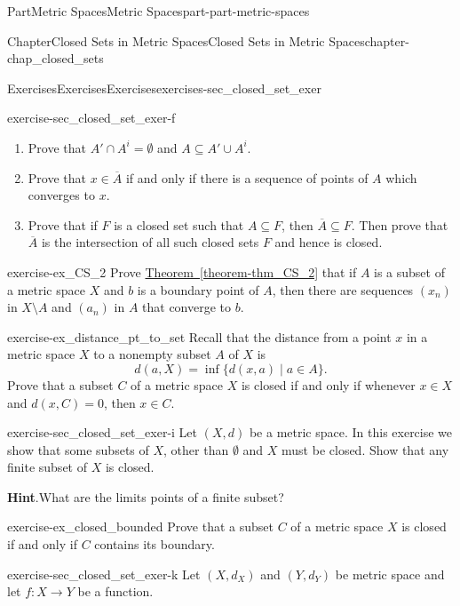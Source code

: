 \documentclass[oneside,10pt,]{book}
\newcommand{\blocktitlefont}{\relax}
\newcommand{\xreffont}{\relax}
\numberwithin{equation}{chapter}
\begin{document}
\begin{partptx}{Part}{Metric Spaces}{}{Metric Spaces}{}{}{part-part-metric-spaces}
\begin{chapterptx}{Chapter}{Closed Sets in Metric Spaces}{}{Closed Sets in Metric Spaces}{}{}{chapter-chap_closed_sets}
\begin{exercises-section}{Exercises}{Exercises}{}{Exercises}{}{}{exercises-sec_closed_set_exer}
\begin{divisionexercise}{6}{}{}{exercise-sec_closed_set_exer-f}
\begin{enumerate}[font=\bfseries,label=(\alph*),ref=\alph*]
\item{}Prove that \(A' \cap A^i = \emptyset\) and \(A \subseteq A' \cup A^i\).%
\item{}Prove that \(x \in \overline{A}\) if and only if there is a sequence of points of \(A\) which converges to \(x\).%
\item{}Prove that if \(F\) is a closed set such that \(A \subseteq F\), then \(\overline{A} \subseteq F\). Then prove that \(\overline{A}\) is the intersection of all such closed sets \(F\) and hence is closed.%
\end{enumerate}%
\end{divisionexercise}%
\begin{divisionexercise}{7}{}{}{exercise-ex_CS_2}%
Prove \hyperref[theorem-thm_CS_2]{Theorem~{\xreffont\ref{theorem-thm_CS_2}}} that if \(A\) is a subset of a metric space \(X\) and \(b\) is a boundary point of \(A\), then there are sequences \((x_n)\) in \(X \setminus A\) and \((a_n)\) in \(A\) that converge to \(b\).%
\end{divisionexercise}%
\begin{divisionexercise}{8}{}{}{exercise-ex_distance_pt_to_set}%
Recall that the distance from a point \(x\) in a metric space \(X\) to a nonempty subset \(A\) of \(X\) is%
\begin{equation*}
d(a,X) = \inf\{d(x,a) \mid a \in A\}\text{.}
\end{equation*}
Prove that a subset \(C\) of a metric space \(X\) is closed if and only if whenever \(x \in X\) and \(d(x,C) = 0\), then \(x \in C\).%
\end{divisionexercise}%
\begin{divisionexercise}{9}{}{}{exercise-sec_closed_set_exer-i}%
Let \((X,d)\) be a metric space. In this exercise we show that some subsets of \(X\), other than \(\emptyset\) and \(X\) must be closed. Show that any finite subset of \(X\) is closed.%
\par\smallskip%
\noindent\textbf{\blocktitlefont Hint}.\hypertarget{hint-sec_closed_set_exer-i-b}{}\quad{}What are the limits points of a finite subset?%
\end{divisionexercise}%
\begin{divisionexercise}{10}{}{}{exercise-ex_closed_bounded}%
Prove that a subset \(C\) of a metric space \(X\) is closed if and only if \(C\) contains its boundary.%
\end{divisionexercise}%
\begin{divisionexercise}{11}{}{}{exercise-sec_closed_set_exer-k}%
Let \((X,d_X)\) and \((Y,d_Y)\) be metric space and let \(f: X \to Y\) be a function.%

\end{divisionexercise}
\end{exercises-section}
\end{chapterptx}
\end{partptx}
\end{document}
